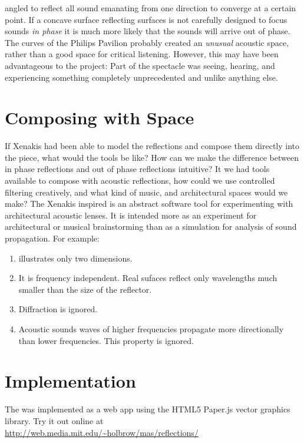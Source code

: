 angled to reflect all sound emanating from one direction to converge
at a certain point. If a concave surface reflecting surfaces is not
carefully designed to focus sounds \textit{in phase} it is much more
likely that the sounds will arrive out of phase. The curves of the
Philips Pavilion probably created an \emph{unusual} acoustic space,
rather than a good space for critical listening. However, this may
have been advantageous to the project: Part of the spectacle was
seeing, hearing, and experiencing something completely unprecedented
and unlike anything else.

\section{Composing with Space}
\label{sec:composing-with-space}
If Xenakis had been able to model the reflections and compose them
directly into the piece, what would the tools be like? How can we make
the difference between in phase reflections and out of phase
reflections intuitive?  It we had tools available to compose with
acoustic reflections, how could we use controlled filtering
creatively, and what kind of music, and architectural spaces would we
make? The Xenakis inspired  is an abstract software tool for
experimenting with architectural acoustic lenses. It is intended more
as an experiment for architectural or musical brainstorming than as a
simulation for analysis of sound propagation. For example:
\begin{enumerate}
\item  illustrates only two dimensions.
\item It is frequency independent. Real sufaces reflect only
  wavelengths much smaller than the size of the
  reflector.\cite{Zhixin2005} 
\item Diffraction is ignored. 
\item Acoustic sounds waves of higher frequencies propagate more
  directionally than lower frequencies. This property is ignored.
\end{enumerate}

\section{Implementation}
\label{sec:refmod-implementation}
The  was implemented as a web app using the HTML5
Paper.js vector graphics
library. Try it out online at\\
\noindent \url{http://web.media.mit.edu/~holbrow/mas/reflections/}

